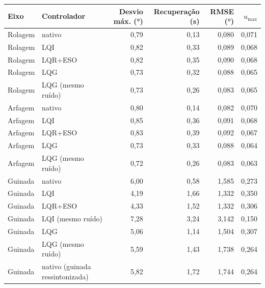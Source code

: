 \begin{tabular}{llrrrr}
\toprule
Eixo & Controlador & Desvio máx. (\si{\degree}) & Recuperação (\si{\second}) & RMSE (\si{\degree}) & $u_{\max}$ \\
\midrule
Rolagem & nativo & 0,79 & 0,13 & 0,080 & 0,071 \\
Rolagem & LQI & 0,82 & 0,33 & 0,089 & 0,068 \\
Rolagem & LQR+ESO & 0,82 & 0,35 & 0,090 & 0,068 \\
Rolagem & LQG & 0,73 & 0,32 & 0,088 & 0,065 \\
Rolagem & LQG (mesmo ruído) & 0,73 & 0,26 & 0,083 & 0,065 \\
\addlinespace
Arfagem & nativo & 0,80 & 0,14 & 0,082 & 0,070 \\
Arfagem & LQI & 0,85 & 0,36 & 0,091 & 0,068 \\
Arfagem & LQR+ESO & 0,83 & 0,39 & 0,092 & 0,067 \\
Arfagem & LQG & 0,73 & 0,33 & 0,088 & 0,064 \\
Arfagem & LQG (mesmo ruído) & 0,72 & 0,26 & 0,083 & 0,063 \\
\addlinespace
Guinada & nativo & 6,00 & 0,58 & 1,585 & 0,273 \\
Guinada & LQI & 4,19 & 1,66 & 1,332 & 0,350 \\
Guinada & LQR+ESO & 4,33 & 1,52 & 1,332 & 0,306 \\
Guinada & LQI (mesmo ruído) & 7,28 & 3,24 & 3,142 & 0,150 \\
Guinada & LQG & 5,06 & 1,14 & 1,504 & 0,307 \\
Guinada & LQG (mesmo ruído) & 5,59 & 1,43 & 1,738 & 0,264 \\
Guinada & nativo (guinada ressintonizada) & 5,82 & 1,72 & 1,744 & 0,264 \\
\bottomrule
\end{tabular}
